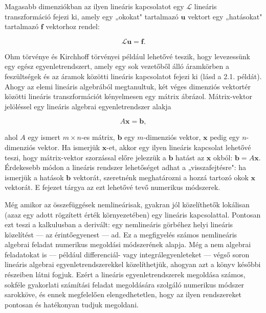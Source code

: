 \documentclass[
  magyar,
  11pt]{article}
\providecommand{\boldsymbol}[1]{\mathbf{#1}}
\begin{document}
Magasabb dimenziókban az ilyen lineáris kapcsolatot egy \(\mathcal{L}\)
lineáris transzformáció fejezi ki, amely egy „okokat" tartalmazó
\(\boldsymbol{u}\) vektort egy „hatásokat" tartalmazó \(\boldsymbol{f}\)
vektorhoz rendel:

\[\mathcal{L}\boldsymbol{u} = \boldsymbol{f}.\]

Ohm törvénye és Kirchhoff törvényei például lehetővé teszik, hogy
levezessünk egy egész egyenletrendszert, amely egy sok vezetőből álló
áramkörben a feszültségek és az áramok közötti lineáris kapcsolatot
fejezi ki (lásd a 2.1. példát). Ahogy az elemi lineáris algebrából
megtanultuk, két véges dimenziós vektortér közötti lineáris
transzformációt kényelmesen egy mátrix ábrázol. Mátrix-vektor jelöléssel
egy lineáris algebrai egyenletrendszer alakja

\[A\boldsymbol{x} = \boldsymbol{b},\]

ahol \(A\) egy ismert \(m \times n\)-es mátrix, \(\boldsymbol{b}\) egy
\(m\)-dimenziós vektor, \(\boldsymbol{x}\) pedig egy \(n\)-dimenziós
vektor. Ha ismerjük \(\boldsymbol{x}\)-et, akkor egy ilyen lineáris
kapcsolat lehetővé teszi, hogy mátrix-vektor szorzással előre jelezzük a
\(\boldsymbol{b}\) hatást az \(\boldsymbol{x}\) okból:
\(\boldsymbol{b} = A\boldsymbol{x}\). Érdekesebb módon a lineáris
rendszer lehetőséget adhat a „visszafejtésre": ha ismerjük a hatások
\(\boldsymbol{b}\) vektorát, szeretnénk meghatározni a hozzá tartozó
okok \(\boldsymbol{x}\) vektorát. E fejezet tárgya az ezt lehetővé tevő
numerikus módszerek.

Még amikor az összefüggések nemlineárisak, gyakran jól közelíthetők
lokálisan (azaz egy adott rögzített érték környezetében) egy lineáris
kapcsolattal. Pontosan ezt teszi a kalkulusban a derivált: egy
nemlineáris görbéhez helyi lineáris közelítést --- az érintőegyenest ---
ad. Ez a megfigyelés számos nemlineáris algebrai feladat numerikus
megoldási módszerének alapja. Még a nem algebrai feladatokat is ---
például differenciál- vagy integrálegyenleteket --- végső soron lineáris
algebrai egyenletrendszerekkel közelíthetjük, ahogyan azt a könyv
későbbi részeiben látni fogjuk. Ezért a lineáris egyenletrendszerek
megoldása számos, sokféle gyakorlati számítási feladat megoldására
szolgáló numerikus módszer sarokköve, és ennek megfelelően
elengedhetetlen, hogy az ilyen rendszereket pontosan és hatékonyan
tudjuk megoldani.
\end{document}

